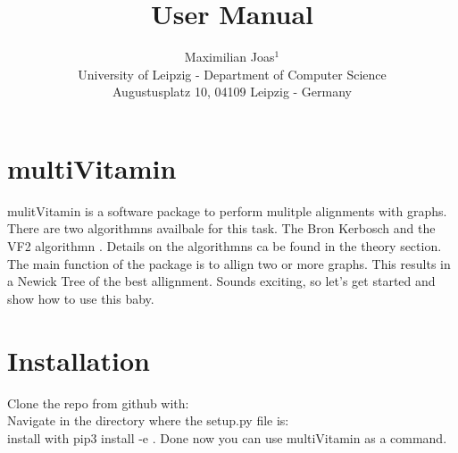 \documentclass{SeminarV2}
\begin{document}
\title{User Manual}

\author{Maximilian Joas$^1$
%
%
\vspace{.3cm}\\
%
University of Leipzig  - Department of Computer Science \\
Augustusplatz 10, 04109 Leipzig  - Germany\\}

%


\maketitle

\begin{abstract}


\end{abstract}

\section{multiVitamin}
mulitVitamin is a software package to perform mulitple alignments with graphs.
There are two algorithmns availbale for this task. The Bron Kerbosch \cite{}
and the VF2 algorithmn \cite{}. Details on the algorithmns ca be found in the
theory section.\\
The main function of the package is to allign two or more graphs. This results
in a Newick Tree \cite{} of the best allignment. Sounds exciting, so let's
get started and show how to use this baby.
\section{Installation}

Clone the repo from github with: \\
Navigate in the directory where the setup.py file is: \\
install with pip3 install -e .
Done now you can use multiVitamin as a command.
\end{document}
